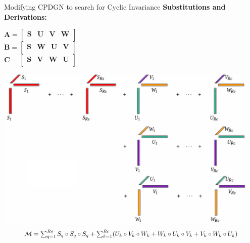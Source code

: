\documentclass[final,hyperref={pdfpagelabels=false}]{beamer}
\begin{document}
\begin{frame}[t]
\begin{columns}[t]
    
    \begin{column}{.5\linewidth}
    \begin{block}{Modifying CPDGN to search for Cyclic Invariance}
            \textbf{Substitutions and Derivations:}
            \begin{center}
                $\mathbf{A} = \begin{bmatrix}
                    \mathbf{S} & \mathbf{U} & \mathbf{V} & \mathbf{W}\\
                \end{bmatrix}$\\
                $\mathbf{B} = \begin{bmatrix}
                    \mathbf{S} & \mathbf{W} & \mathbf{U} & \mathbf{V}\\
                \end{bmatrix}$\\
                $\mathbf{C} = \begin{bmatrix}
                    \mathbf{S} & \mathbf{V} & \mathbf{W} & \mathbf{U}\\
                \end{bmatrix}$
            \end{center}

            \begin{center}     
                \includegraphics[scale=10, width=0.95\textwidth]{PicassoCo_ml_resize_x2.jpg}
                \begin{equation*}
                    \scalebox{0.9}{$
                    \small{\mathcal{M} = \sum_{q=1}^{Rs} S_q \circ S_q \circ S_q} + \sum_{k=1}^{Rc} (U_k \circ V_k \circ W_k + W_k \circ U_k \circ V_k + V_k \circ W_k \circ U_k)$} 
                \end{equation*}
            \end{center}


\end{block}
\end{column}
\end{columns}
\end{frame}
\end{document}
